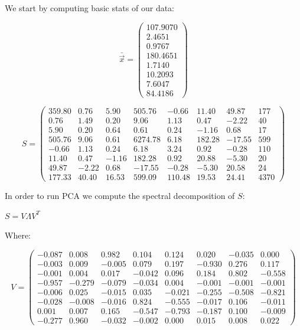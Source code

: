 \documentclass[11pt,a4paper]{article}
\begin{document}
	We start by computing basic stats of our data:
	
	
	$$ \bar{\vec{x}} = 
	\begin{pmatrix}
		107.9070 \\
		2.4651   \\
		0.9767   \\
		180.4651 \\
		1.7140   \\
		10.2093  \\
		7.6047   \\
		84.4186 
	\end{pmatrix}
	$$
	
	$$ S = 
	\begin{pmatrix}
		359.80 & 0.76  & 5.90  & 505.76  & -0.66  & 11.40  & 49.87  & 177  \\
		0.76   & 1.49  & 0.20  & 9.06    & 1.13   & 0.47   & -2.22  & 40   \\
		5.90   & 0.20  & 0.64  & 0.61    & 0.24   & -1.16  & 0.68   & 17   \\
		505.76 & 9.06  & 0.61  & 6274.78 & 6.18   & 182.28 & -17.55 & 599  \\
		-0.66  & 1.13  & 0.24  & 6.18    & 3.24   & 0.92   & -0.28  & 110  \\
		11.40  & 0.47  & -1.16 & 182.28  & 0.92   & 20.88  & -5.30  & 20   \\
		49.87  & -2.22 & 0.68  & -17.55  & -0.28  & -5.30  & 20.58  & 24   \\
		177.33 & 40.40 & 16.53 & 599.09  & 110.48 & 19.53  & 24.41  & 4370                 
	\end{pmatrix} 
	$$ 
	
	In order to run PCA we compute the spectral decomposition of $S$:
	
	$ S = V \Lambda V^T$
	
	Where:
	
	$$ V = 
	\begin{pmatrix}
		-0.087 & 0.008  & 0.982  & 0.104  & 0.124  & 0.020  & -0.035 & 0.000  \\
		-0.003 & 0.009  & -0.005 & 0.079  & 0.197  & -0.930 & 0.276  & 0.117  \\
		-0.001 & 0.004  & 0.017  & -0.042 & 0.096  & 0.184  & 0.802  & -0.558 \\
		-0.957 & -0.279 & -0.079 & -0.034 & 0.004  & -0.001 & -0.001 & -0.001 \\
		-0.006 & 0.025  & -0.015 & 0.035  & -0.021 & -0.255 & -0.508 & -0.821 \\
		-0.028 & -0.008 & -0.016 & 0.824  & -0.555 & -0.017 & 0.106  & -0.011 \\
		0.001  & 0.007  & 0.165  & -0.547 & -0.793 & -0.187 & 0.100  & -0.009 \\
		-0.277 & 0.960  & -0.032 & -0.002 & 0.000  & 0.015  & 0.008  & 0.022 
	\end{pmatrix} 
	$$ 
	
\end{document}
